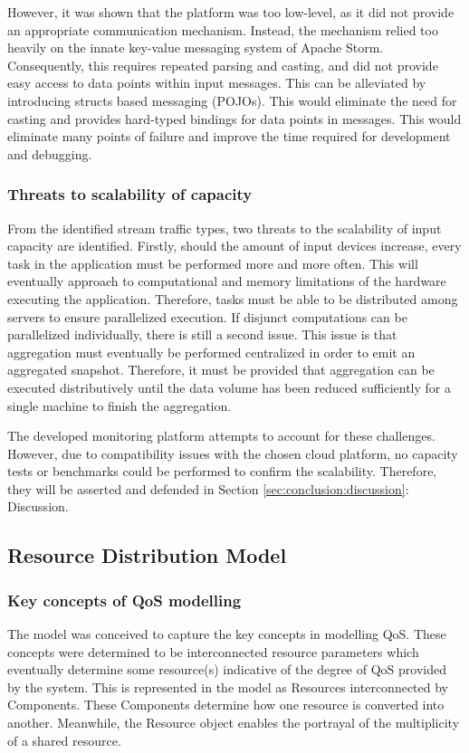 However, it was shown that the platform was too low-level, as it did not provide an appropriate communication mechanism. Instead, the mechanism relied too heavily on the innate key-value messaging system of Apache Storm. Consequently, this requires repeated parsing and casting, and did not provide easy access to data points within input messages. This can be alleviated by introducing structs based messaging (POJOs). This would eliminate the need for casting and provides hard-typed bindings for data points in messages. This would eliminate many points of failure and improve the time required for development and debugging.

\subsubsection{Threats to scalability of capacity}
From the identified stream traffic types, two threats to the scalability of input capacity are identified. Firstly, should the amount of input devices increase, every task in the application must be performed more and more often. This will eventually approach to computational and memory limitations of the hardware executing the application. Therefore, tasks must be able to be distributed among servers to ensure parallelized execution. If disjunct computations can be parallelized individually, there is still a second issue. This issue is that aggregation must eventually be performed centralized in order to emit an aggregated snapshot. Therefore, it must be provided that aggregation can be executed distributively until the data volume has been reduced sufficiently for a single machine to finish the aggregation.

The developed monitoring platform attempts to account for these challenges. However, due to compatibility issues with the chosen cloud platform, no capacity tests or benchmarks could be performed to confirm the scalability. Therefore, they will be asserted and defended in Section \ref{sec:conclusion:discussion}: Discussion.


\subsection{Resource Distribution Model}
\subsubsection{Key concepts of QoS modelling}
The model was conceived to capture the key concepts in modelling QoS. These concepts were determined to be interconnected resource parameters which eventually determine some resource(s) indicative of the degree of QoS provided by the system. This is represented in the model as Resources interconnected by Components. These Components determine how one resource is converted into another. Meanwhile, the Resource object enables the portrayal of the multiplicity of a shared resource.


